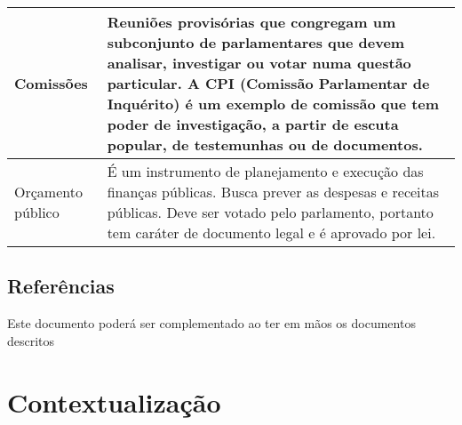 \documentclass[12pt, a4paper]{article}
\begin{document}
\begin{longtabu}{X[-1] | X}
                Comissões &
                Reuniões provisórias que congregam um subconjunto de
                parlamentares que devem analisar, investigar ou votar numa
                questão particular. A CPI (Comissão Parlamentar de Inquérito) é
                um exemplo de comissão que tem poder de investigação, a partir
                de escuta popular, de testemunhas ou de documentos.
                \\ \hline

                Orçamento público &
                É um instrumento de planejamento e execução das finanças
                públicas. Busca prever as despesas e receitas públicas. Deve
                ser votado pelo parlamento, portanto tem caráter de documento
                legal e é aprovado por lei.
                \\ \hline
            \end{longtabu}

        \subsection{Referências}
        {\color{red} Este documento poderá ser complementado ao ter em mãos os
        documentos descritos}

    \section{Contextualização}
\end{document}
